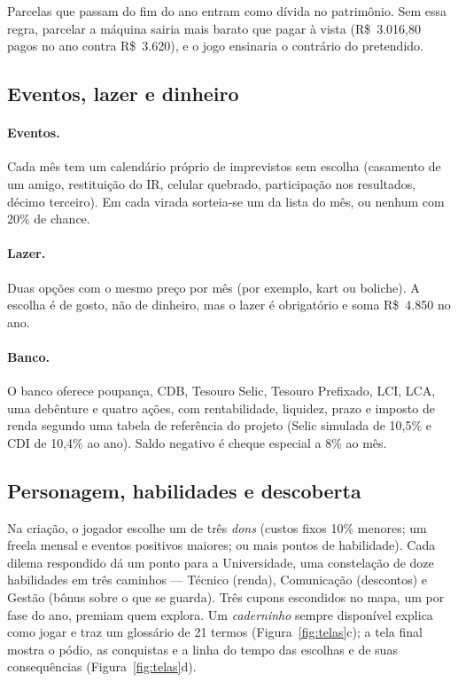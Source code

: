 \documentclass[11pt,a4paper]{article}
\begin{document}
Parcelas que passam do fim do ano entram como dívida no patrimônio. Sem essa regra, parcelar a máquina sairia mais barato que pagar à vista (R\$~3.016,80 pagos no ano contra R\$~3.620), e o jogo ensinaria o contrário do pretendido.

\subsection{Eventos, lazer e dinheiro}

\paragraph{Eventos.} Cada mês tem um calendário próprio de imprevistos sem escolha (casamento de um amigo, restituição do IR, celular quebrado, participação nos resultados, décimo terceiro). Em cada virada sorteia-se um da lista do mês, ou nenhum com 20\% de chance.

\paragraph{Lazer.} Duas opções com o mesmo preço por mês (por exemplo, kart ou boliche). A escolha é de gosto, não de dinheiro, mas o lazer é obrigatório e soma R\$~4.850 no ano.

\paragraph{Banco.} O banco oferece poupança, CDB, Tesouro Selic, Tesouro Prefixado, LCI, LCA, uma debênture e quatro ações, com rentabilidade, liquidez, prazo e imposto de renda segundo uma tabela de referência do projeto (Selic simulada de 10,5\% e CDI de 10,4\% ao ano). Saldo negativo é cheque especial a 8\% ao mês.

\subsection{Personagem, habilidades e descoberta}

Na criação, o jogador escolhe um de três \emph{dons} (custos fixos 10\% menores; um freela mensal e eventos positivos maiores; ou mais pontos de habilidade). Cada dilema respondido dá um ponto para a Universidade, uma constelação de doze habilidades em três caminhos --- Técnico (renda), Comunicação (descontos) e Gestão (bônus sobre o que se guarda). Três cupons escondidos no mapa, um por fase do ano, premiam quem explora. Um \emph{caderninho} sempre disponível explica como jogar e traz um glossário de 21 termos (Figura~\ref{fig:telas}c); a tela final mostra o pódio, as conquistas e a linha do tempo das escolhas e de suas consequências (Figura~\ref{fig:telas}d).
\end{document}
